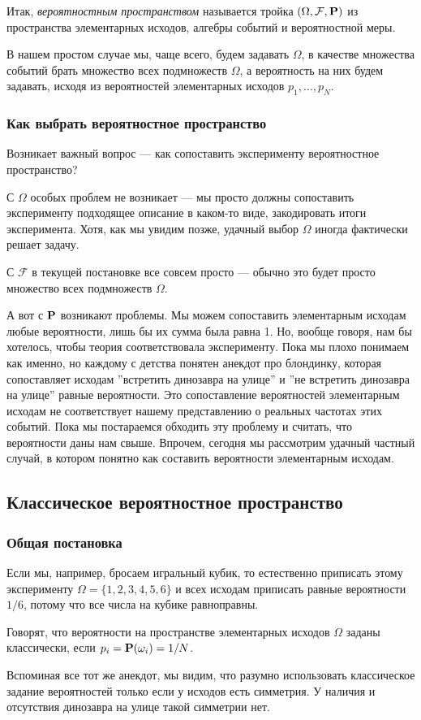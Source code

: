 \documentclass[11 pt,russian]{article}
\begin{document}
\begin{Def}
Итак, {\it вероятностным пространством} называется тройка $(\Omega,\mathcal{F},{\bf P})$ из пространства элементарных исходов, алгебры событий и вероятностной меры.
\end{Def}
В нашем простом случае мы, чаще всего, будем задавать $\Omega$, в качестве множества событий брать множество всех подмножеств $\Omega$, а вероятность на них будем задавать, исходя из вероятностей элементарных исходов $p_1,\dotsc, p_N$.
\subsubsection{Как выбрать вероятностное пространство}
Возникает важный вопрос --- как сопоставить эксперименту вероятностное пространство?

С $\Omega$ особых проблем не возникает --- мы просто должны сопоставить эксперименту подходящее описание в каком-то виде, закодировать итоги эксперимента. Хотя, как мы увидим позже, удачный выбор $\Omega$ иногда фактически решает задачу.

С $\mathcal{F}$ в текущей постановке все совсем просто --- обычно это будет просто множество всех подмножеств $\Omega$.

А вот с ${\bf P}$ возникают проблемы. Мы можем сопоставить элементарным исходам любые вероятности, лишь бы их сумма была равна 1. Но, вообще говоря, нам бы хотелось, чтобы теория соответствовала эксперименту. Пока мы плохо понимаем как именно, но каждому с детства понятен анекдот про блондинку, которая сопоставляет исходам ''встретить динозавра на улице'' и ''не встретить динозавра на улице'' равные вероятности. Это сопоставление вероятностей элементарным исходам не соответствует нашему представлению о реальных частотах этих событий. Пока мы постараемся обходить эту проблему и считать, что вероятности даны нам свыше. Впрочем, сегодня мы рассмотрим удачный частный случай, в котором понятно как составить вероятности элементарным исходам.

\subsection{Классическое вероятностное пространство}
\subsubsection{Общая постановка}
Если мы, например, бросаем игральный кубик, то естественно приписать этому эксперименту $\Omega = \{1,2,3,4,5,6\}$ и всех исходам приписать равные вероятности $1/6$, потому что все числа на кубике равноправны.
\begin{Def}
Говорят, что вероятности на пространстве элементарных исходов $\Omega$ заданы классически, если $p_i = {\bf P}(\omega_i) = 1/N$. 
\end{Def}
Вспоминая все тот же анекдот, мы видим, что разумно использовать классическое задание вероятностей только если у исходов есть симметрия. У наличия и отсутствия динозавра на улице такой симметрии нет.
\end{document}
